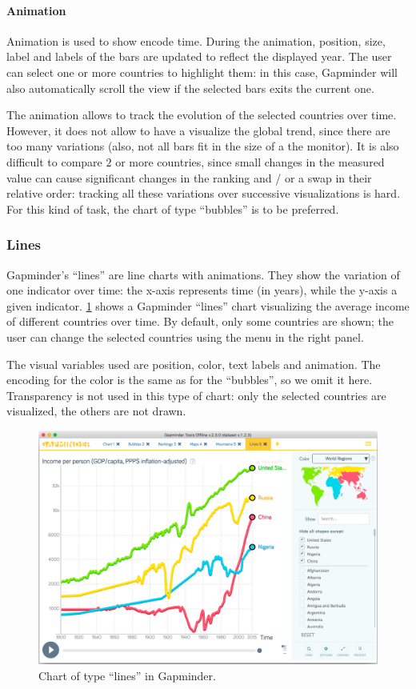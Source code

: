 \paragraph{Animation}
Animation is used to show encode time.
During the animation, position, size, label and labels of the bars are updated to reflect the displayed year.
The user can select one or more countries to highlight them:
in this case, Gapminder will also automatically scroll the view if the selected bars exits the current one.

The animation allows to track the evolution of the selected countries over time.
However, it does not allow to have a visualize the global trend, since there are too many variations (also, not all bars fit in the size of a the monitor).
It is also difficult to compare $2$ or more countries, since small changes in the measured value can cause significant changes in the ranking and / or a swap in their relative order: tracking all these variations over successive visualizations is hard.
For this kind of task, the chart of type ``bubbles'' is to be preferred.


\subsubsection{Lines}
Gapminder's ``lines'' are line charts with animations.
They show the variation of one indicator over time:
the x-axis represents time (in years), while the y-axis a given indicator.
\cref{fig:lines} shows a Gapminder ``lines'' chart visualizing the average income of different countries over time.
By default, only some countries are shown;
the user can change the selected countries using the menu in the right panel.

The visual variables used are position, color, text labels and animation.
The encoding for the color is the same as for the ``bubbles'', so we omit it here.
Transparency is not used in this type of chart:
only the selected countries are visualized, the others are not drawn.

\begin{figure}[h]
	\centering
	\includegraphics[width=0.95\columnwidth]{figures/lines}
	\caption{Chart of type ``lines'' in Gapminder.}
	\label{fig:lines}
\end{figure}

